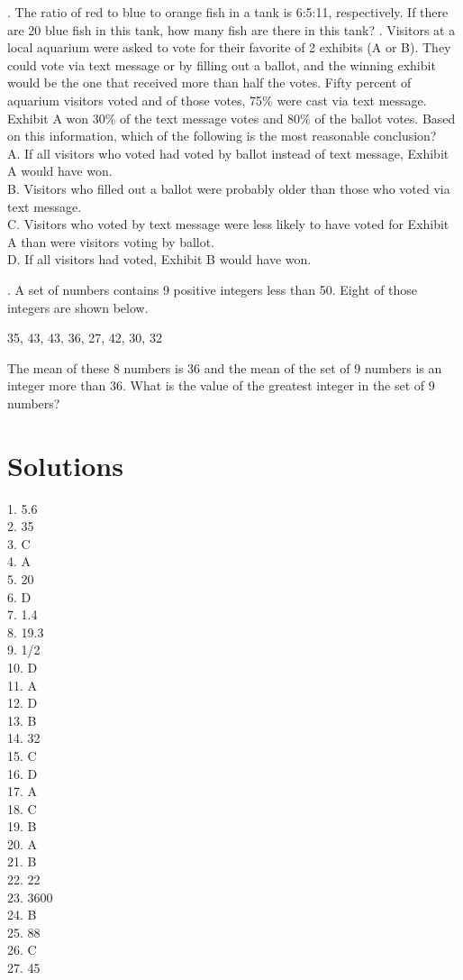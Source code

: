 \documentclass[../satmath.tex]{subfiles}
\begin{document}
\begin{enumerate}[label=\bfseries\arabic*.]
. The ratio of red to blue to orange fish in a tank is 6:5:11, respectively. If there are 20 blue fish in this tank, how many fish are there in this tank?
. Visitors at a local aquarium were asked to vote for their favorite of 2 exhibits (A or B). They could vote via text message or by filling out a ballot, 
and the winning exhibit would be the one that received more than half the votes. Fifty percent of aquarium visitors voted and of those votes, 75\% 
were cast via text message. Exhibit A won 30\% of the text message votes and 80\% of the ballot votes. Based on this information, which of the following is the most 
reasonable conclusion?\\
A. If all visitors who voted had voted by ballot instead of text message, Exhibit A would have won.\\
B. Visitors who filled out a ballot were probably older than those who voted via text message.\\
C. Visitors who voted by text message were less likely to have voted for Exhibit A than were visitors voting by ballot.\\
D. If all visitors had voted, Exhibit B would have won.

. A set of numbers contains 9 positive integers less than 50. Eight of those integers are shown below.
\begin{center}
    35, 43, 43, 36, 27, 42, 30, 32
\end{center}
The mean of these 8 numbers is 36 and the mean of the set of 9 numbers is an integer more than 36. What is the value of the greatest integer in the set of 9 numbers?
\end{enumerate}

\section*{Solutions}

1. 5.6\\
2. 35\\
3. C\\
4. A\\
5. 20\\
6. D\\
7. 1.4\\
8. 19.3\\
9. 1/2\\
10. D\\
11. A\\
12. D\\
13. B\\
14. 32\\
15. C\\
16. D\\
17. A\\
18. C\\
19. B\\
20. A\\
21. B\\
22. 22\\
23. 3600\\
24. B\\
25. 88\\
26. C\\
27. 45\\
\end{document}
